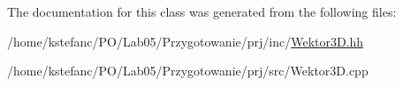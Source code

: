 The documentation for this class was generated from the following files\+:\begin{DoxyCompactItemize}
\item 
/home/kstefanc/\+P\+O/\+Lab05/\+Przygotowanie/prj/inc/\hyperlink{_wektor3_d_8hh}{Wektor3\+D.\+hh}\item 
/home/kstefanc/\+P\+O/\+Lab05/\+Przygotowanie/prj/src/Wektor3\+D.\+cpp\end{DoxyCompactItemize}
